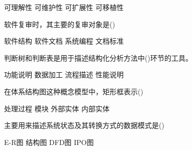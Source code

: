 \documentclass[answer]{exam}
\begin{document}
\begin{questions}
	\begin{oneparchoices}
		\choice 可理解性
		\choice 可维护性
		\choice 可扩展性
		\choice 可移植性
	\end{oneparchoices}
	\question 软件复审时，其主要的复审对象是()\\
	\begin{oneparchoices}
		\choice 软件结构
		\choice 软件文档
		\choice 系统编程
		\choice 文档标准
	\end{oneparchoices}
	\question 判断树和判断表是用于描述结构化分析方法中()环节的工具。\\
	\begin{oneparchoices}
		\choice 功能说明
		\choice 数据加工
		\choice 流程描述
		\choice 性能说明
	\end{oneparchoices}
	\question 在体系结构图这种概念模型中，矩形框表示()\\
	\begin{oneparchoices}
		\choice 处理过程
		\choice 模块
		\choice 外部实体
		\choice 内部实体
	\end{oneparchoices}
	\question 主要用来描述系统状态及其转换方式的数据模式是()\\
	\begin{oneparchoices}
		\choice E-R图
		\choice 结构图
		\choice DFD图
		\choice IPO图
	\end{oneparchoices}
\end{questions}
\end{document}
